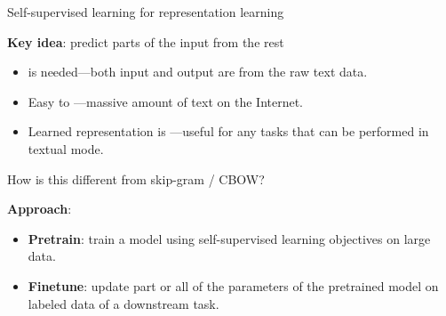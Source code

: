 \documentclass[usenames,dvipsnames,notes,11pt,aspectratio=169,hyperref={colorlinks=true, linkcolor=blue}]{beamer}
\begin{document}
\begin{frame}
    {Self-supervised learning for representation learning}

    \textbf{Key idea}: predict parts of the input from the rest\\
    \begin{itemize}
        \item {} is needed---both input and output are from the raw text data.
        \item Easy to ---massive amount of text on the Internet.
        \item Learned representation is ---useful for any tasks that can be performed in textual mode.
    \end{itemize}
    \pause
    How is this different from skip-gram / CBOW?

    \pause
    \textbf{Approach}:\\
    \begin{itemize}
        \item \textbf{Pretrain}: train a model using self-supervised learning objectives on large data.
        \item \textbf{Finetune}: update part or all of the parameters of the pretrained model on labeled data of a downstream task.
    \end{itemize}
\end{frame}
\end{document}
